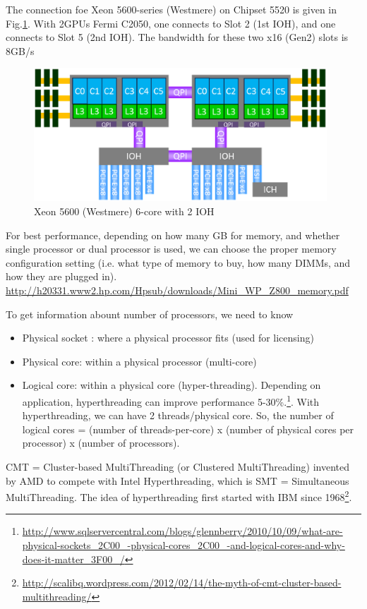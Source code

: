 The connection foe Xeon 5600-series (Westmere) on Chipset 5520 is given in
Fig.\ref{fig:Xeon5600_Chipset5520}. With 2GPUs Fermi C2050, one connects to Slot
2 (1st IOH), and one connects to Slot 5 (2nd IOH). The bandwidth for these two
x16 (Gen2) slots is 8GB/s

\begin{figure}[hbt]
  \centerline{\includegraphics[height=5cm,
    angle=0]{./images/Xeon5600-Chipset5520.eps}}
\caption{Xeon 5600 (Westmere) 6-core with 2 IOH}
\label{fig:Xeon5600_Chipset5520}
\end{figure}

For best performance, depending on how many GB for memory, and whether single
processor or dual processor is used, we can choose the proper memory
configuration setting (i.e. what type of memory to buy, how many DIMMs, and how
they are plugged in).
\url{http://h20331.www2.hp.com/Hpsub/downloads/Mini_WP_Z800_memory.pdf}

To get information abount number of processors, we need to know
\begin{itemize}
  \item Physical socket : where a physical processor fits (used for licensing)
  \item Physical core: within a physical processor (multi-core)
  \item Logical core: within a physical core (hyper-threading). Depending on
  application, hyperthreading can improve performance
  5-30\%.\footnote{\url{http://www.sqlservercentral.com/blogs/glennberry/2010/10/09/what-are-physical-sockets_2C00_-physical-cores_2C00_-and-logical-cores-and-why-does-it-matter_3F00_/}}.
  With hyperthreading, we can have 2 threads/physical core. So, the number of
  logical cores = (number of threads-per-core) x (number of physical cores per
  processor) x (number of processors).
\end{itemize}
CMT = Cluster-based MultiThreading (or Clustered MultiThreading) invented by
AMD to compete with Intel Hyperthreading, which is SMT = Simultaneous
MultiThreading. The idea of hyperthreading first started with IBM since
1968\footnote{\url{http://scalibq.wordpress.com/2012/02/14/the-myth-of-cmt-cluster-based-multithreading/}}.




